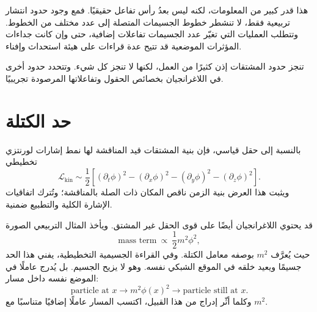 هذا قدر كبير من المعلومات، لكنه ليس بعدُ رأس تفاعل حقيقيًا. فمع وجود حدود انتشار تربيعية فقط، لا تنشطر خطوط الجسيمات المتصلة إلى عدد مختلف من الخطوط. وتتطلب العمليات التي تغيّر عدد الجسيمات تفاعلات إضافية، حتى وإن كانت جداءات المؤثرات الموضعية قد تتيح عدة قراءات على هيئة استحداث وإفناء.

\begin{classroomqa}
\end{classroomqa}


تنجز حدود المشتقات إذن كثيرًا من العمل، لكنها لا تنجز كل شيء. وتتحدد حدود أخرى في اللاغرانجيان بخصائص الحقول وتفاعلاتها المرصودة تجريبيًا.

\section{حد الكتلة}

بالنسبة إلى حقل قياسي، فإن بنية المشتقات قيد المناقشة لها نمط إشارات لورنتزي تخطيطي
\begin{equation}
\mathcal{L}_{\mathrm{kin}}
\sim
\frac{1}{2}\left[
(\partial_t\phi)^2
-(\partial_x\phi)^2
-(\partial_y\phi)^2
-(\partial_z\phi)^2
\right].
\end{equation}
ويثبت هذا العرض بنية الزمن ناقص المكان ذات الصلة بالمناقشة؛ وتُترك اتفاقيات الإشارة الكلية والتطبيع ضمنية.

قد يحتوي اللاغرانجيان أيضًا على قوى الحقل غير المشتق. ويأخذ المثال التربيعي الصورة
\begin{equation}
\text{mass term}\ \propto\ \frac{1}{2}m^2\phi^2,
\end{equation}
حيث يُعرَّف \(m^2\) بوصفه معامل الكتلة. وفي القراءة الجسيمية التخطيطية، يفني هذا الحد جسيمًا ويعيد خلقه في الموقع الشبكي نفسه. وهو لا يزيح الجسيم. بل يُدرج عاملًا في الموضع نفسه داخل مسار:
\begin{equation}
\text{particle at }x
\longrightarrow
\boxed{m^2\phi(x)^2}
\longrightarrow
\text{particle still at }x.
\end{equation}
وكلما أثّر إدراج من هذا القبيل، اكتسب المسار عاملًا إضافيًا متناسبًا مع \(m^2\).

